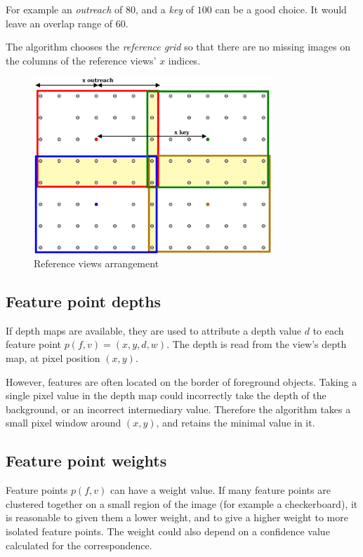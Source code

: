 \documentclass{scrreprt}
\begin{document}
For example an \emph{outreach} of $80$, and a \emph{key} of $100$ can be a good choice. It would leave an overlap range of $60$.

The algorithm chooses the \emph{reference grid} so that there are no missing images on the columns of the reference views' $x$ indices.

\begin{figure}
\centering
\includegraphics[width=0.8\textwidth]{refview.pdf}
\caption{Reference views arrangement}
\label{fig:refview}
\end{figure}


\subsection{Feature point depths}
If depth maps are available, they are used to attribute a depth value $d$ to each feature point $p(f,v) = (x,y,d,w)$. The depth is read from the view's depth map, at pixel position $(x,y)$.

However, features are often located on the border of foreground objects. Taking a single pixel value in the depth map could incorrectly take the depth of the background, or an incorrect intermediary value. Therefore the algorithm takes a small pixel window around $(x,y)$, and retains the minimal value in it.



\subsection{Feature point weights}
Feature points $p(f,v)$ can have a weight value. If many feature points are clustered together on a small region of the image (for example a checkerboard), it is reasonable to given them a lower weight, and to give a higher weight to more isolated feature points. The weight could also depend on a confidence value calculated for the correspondence.
\end{document}
